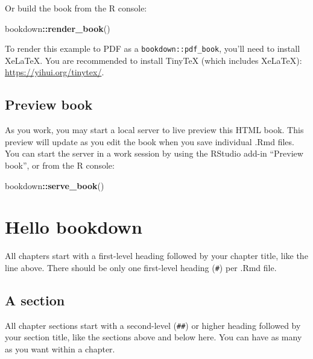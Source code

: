 \documentclass[
]{book}
\newenvironment{Shaded}{\begin{snugshade}}{\end{snugshade}}
\newcommand{\FunctionTok}[1]{\textcolor[rgb]{0.13,0.29,0.53}{\textbf{#1}}}
\newcommand{\NormalTok}[1]{#1}
\newcommand{\SpecialCharTok}[1]{\textcolor[rgb]{0.81,0.36,0.00}{\textbf{#1}}}
\theoremstyle{definition}
\theoremstyle{definition}
\theoremstyle{definition}
\theoremstyle{definition}
\theoremstyle{remark}
\begin{document}
Or build the book from the R console:

\begin{Shaded}
\begin{Highlighting}[]
\NormalTok{bookdown}\SpecialCharTok{::}\FunctionTok{render\_book}\NormalTok{()}
\end{Highlighting}
\end{Shaded}

To render this example to PDF as a \texttt{bookdown::pdf\_book}, you'll need to install XeLaTeX. You are recommended to install TinyTeX (which includes XeLaTeX): \url{https://yihui.org/tinytex/}.

\hypertarget{preview-book}{%
\section{Preview book}\label{preview-book}}

As you work, you may start a local server to live preview this HTML book. This preview will update as you edit the book when you save individual .Rmd files. You can start the server in a work session by using the RStudio add-in ``Preview book'', or from the R console:

\begin{Shaded}
\begin{Highlighting}[]
\NormalTok{bookdown}\SpecialCharTok{::}\FunctionTok{serve\_book}\NormalTok{()}
\end{Highlighting}
\end{Shaded}

\hypertarget{hello-bookdown}{%
\chapter{Hello bookdown}\label{hello-bookdown}}

All chapters start with a first-level heading followed by your chapter title, like the line above. There should be only one first-level heading (\texttt{\#}) per .Rmd file.

\hypertarget{a-section}{%
\section{A section}\label{a-section}}

All chapter sections start with a second-level (\texttt{\#\#}) or higher heading followed by your section title, like the sections above and below here. You can have as many as you want within a chapter.
\end{document}
